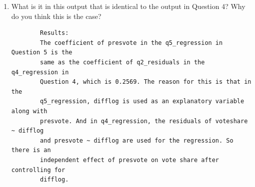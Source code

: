 \documentclass[12pt,letterpaper]{article}
\begin{document}
\begin{enumerate}
		\item What is it in this output that is identical to the output in Question 4? Why do you think this is the case?
		
		\begin{verbatim} 
		Results: 
		The coefficient of presvote in the q5_regression in Question 5 is the 
		same as the coefficient of q2_residuals in the q4_regression in 
		Question 4, which is 0.2569. The reason for this is that in the 
		q5_regression, difflog is used as an explanatory variable along with 
		presvote. And in q4_regression, the residuals of voteshare ~ difflog 
		and presvote ~ difflog are used for the regression. So there is an 
		independent effect of presvote on vote share after controlling for 
		difflog.
		\end{verbatim}
		
	\end{enumerate}
\end{document}
